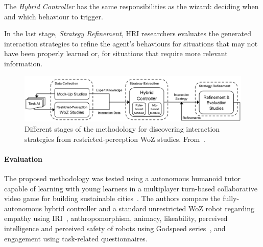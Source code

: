 The \textit{Hybrid Controller} has the same responsibilities as the wizard: deciding when and which behaviour to trigger.

In the last stage, \textit{Strategy Refinement}, \ac{HRI} researchers evaluates the generated interaction strategies to refine the agent's behaviours for situations that may not have been properly learned or, for situations that require more relevant information.

\begin{figure}
	\centering
	\includegraphics[width=\textwidth]{images/RestrictedPerception_DesignProcess.png}
	\caption{Different stages of the methodology for discovering interaction strategies from restricted-perception \ac{WoZ} studies. From~\cite{Sequeira2016}.}
	\label{fig:RestrictedPerception_DesignProcess}
\end{figure}


\paragraph{\textbf{Evaluation}}

The proposed methodology was tested using a autonomous humanoid tutor capable of learning with young learners in a multiplayer turn-based collaborative video game for building sustainable cities~\cite{Ribeiro2014}. The authors compare the fully-autonomous hybrid controller and a standard unrestricted \ac{WoZ} robot regarding empathy using \ac{IRI}~\cite{Davis1980}, anthropomorphism, animacy, likeability, perceived intelligence and perceived safety of robots using Godspeed series~\cite{Bartneck2009}, and engagement using task-related questionnaires.


